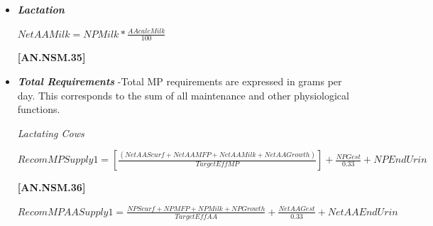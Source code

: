 \begin{refsection}
\begin{itemize}
    \begin{center}
    \(NPGest = GainGrUter * 125\)
    \end{center}

\vspace{0.5cm}
            {\raggedleft \textbf{[AN.NSM.33]}\par}
            \vspace{0.5cm}  

    \begin{center}
    \(NetAAGest = NPGest * \frac{AACorrWEBW}{100}\)
    \end{center}

\vspace{0.5cm}
            {\raggedleft \textbf{[AN.NSM.34]}\par}
            \vspace{0.5cm}  
            
    \item \textbf{\textit{Lactation}}
\vspace{0.2cm}

    \begin{center}
    \(NetAAMilk = NPMilk * \frac{AAcalcMilk}{100}\)
    \end{center}

\vspace{0.5cm}
            {\raggedleft \textbf{[AN.NSM.35]}\par}
            \vspace{0.5cm}  

        \item \textbf{\textit{Total Requirements}} -Total MP requirements are expressed in grams per day. This corresponds to the sum of all maintenance and other physiological functions.
\vspace{0.2cm}

\textit{\small Lactating Cows}
\vspace{0.2cm}

    \begin{center}
    \(RecomMPSupply1 =  [\frac{(NetAAScurf + NetAAMFP + NetAAMilk + NetAAGrowth)}{TargetEffMP}] + \frac{NPGest}{0.33} +NPEndUrin\)
    \end{center}

\vspace{0.5cm}
            {\raggedleft \textbf{[AN.NSM.36]}\par}
            \vspace{0.5cm}

    \begin{center}
    \(RecomMPAASupply1 =  \frac{NPScurf + NPMFP + NPMilk + NPGrowth}{TargetEffAA} + \frac{NetAAGest}{0.33} + NetAAEndUrin\)
    \end{center}


\end{itemize}
\end{refsection}
